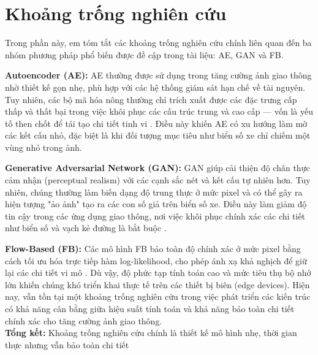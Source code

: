 \chapter{Khoảng trống nghiên cứu}

Trong phần này, em tóm tắt các khoảng trống nghiên cứu chính liên quan đến ba nhóm phương pháp phổ biến được đề cập trong tài liệu: AE, GAN và FB.

\textbf{Autoencoder (AE):} AE thường được sử dụng trong tăng cường ảnh giao thông nhờ thiết kế gọn nhẹ, phù hợp với các hệ thống giám sát hạn chế về tài nguyên. Tuy nhiên, các bộ mã hóa nông thường chỉ trích xuất được các đặc trưng cấp thấp và thất bại trong việc khôi phục các cấu trúc trung và cao cấp — vốn là yếu tố then chốt để tái tạo chi tiết tinh vi \citep{vincent2008, zhang2017}. Điều này khiến AE có xu hướng làm mờ các kết cấu nhỏ, đặc biệt là khi đối tượng mục tiêu như biển số xe chỉ chiếm một vùng nhỏ trong ảnh.

\textbf{Generative Adversarial Network (GAN):} GAN giúp cải thiện độ chân thực cảm nhận (perceptual realism) với các cạnh sắc nét và kết cấu tự nhiên hơn. Tuy nhiên, chúng thường làm biến dạng độ trung thực ở mức pixel và có thể gây ra hiện tượng "ảo ảnh" tạo ra các con số giả trên biển số xe. Điều này làm giảm độ tin cậy trong các ứng dụng giao thông, nơi việc khôi phục chính xác các chi tiết như biển số và vạch kẻ đường là bắt buộc \citep{kupyn2018}.

\textbf{Flow-Based (FB):} Các mô hình FB bảo toàn độ chính xác ở mức pixel bằng cách tối ưu hóa trực tiếp hàm log-likelihood, cho phép ánh xạ khả nghịch để giữ lại các chi tiết vi mô \citep{dinh2017, kingma2018}. Dù vậy, độ phức tạp tính toán cao và mức tiêu thụ bộ nhớ lớn khiến chúng khó triển khai thực tế trên các thiết bị biên (edge devices). Hiện nay, vẫn tồn tại một khoảng trống nghiên cứu trong việc phát triển các kiến trúc có khả năng cân bằng giữa hiệu suất tính toán và khả năng bảo toàn chi tiết chính xác cho tăng cường ảnh giao thông.\\
\textbf{Tổng kết:} Khoảng trống nghiên cứu chính là thiết kế mô hình nhẹ, thời gian thực nhưng vẫn bảo toàn chi tiết

